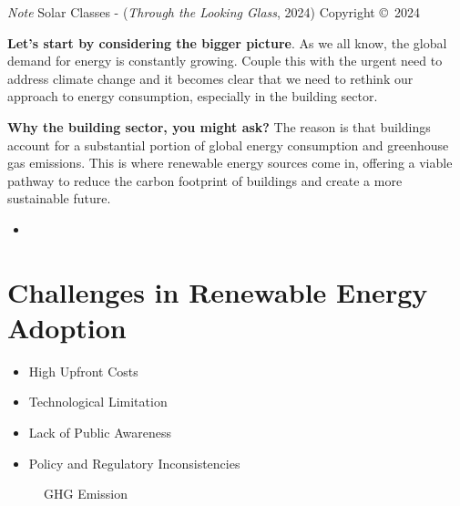 \documentclass[
  letterpaper,
  DIV=11,
  numbers=noendperiod]{scrartcl}
\providecommand{\tightlist}{%
  \setlength{\itemsep}{0pt}\setlength{\parskip}{0pt}}\usepackage{longtable,booktabs,array}
\begin{document}
\emph{Note} Solar Classes - (\emph{Through the {Looking Glass}}, 2024)
Copyright ©~2024

\textbf{Let's start by considering the bigger picture}. As we all know,
the global demand for energy is constantly growing. Couple this with the
urgent need to address climate change and it becomes clear that we need
to rethink our approach to energy consumption, especially in the
building sector.

\textbf{Why the building sector, you might ask?} The reason is that
buildings account for a substantial portion of global energy consumption
and greenhouse gas emissions. This is where renewable energy sources
come in, offering a viable pathway to reduce the carbon footprint of
buildings and create a more sustainable future.

\begin{itemize}
\tightlist
\item
\end{itemize}

\section{Challenges in Renewable Energy
Adoption}\label{challenges-in-renewable-energy-adoption}

\begin{itemize}
\tightlist
\item
  High Upfront Costs
\item
  Technological Limitation
\item
  Lack of Public Awareness
\item
  Policy and Regulatory Inconsistencies
\end{itemize}

\begin{figure}


\caption{\label{fig-problens}GHG Emission}

\end{figure}%
\end{document}
